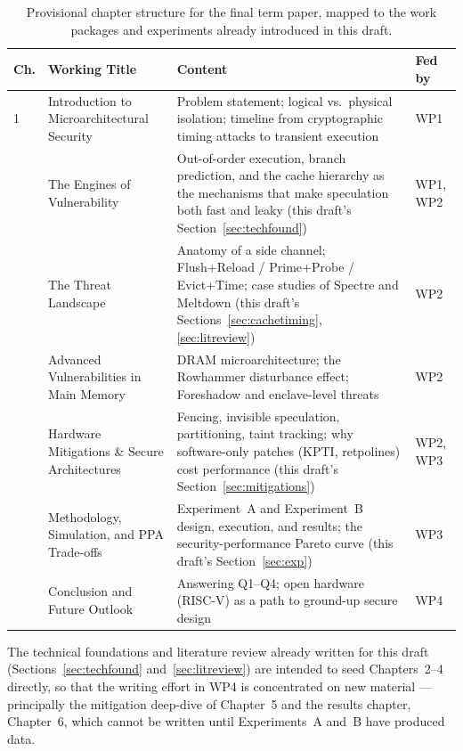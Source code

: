 \documentclass[11pt,a4paper]{article}
\begin{document}
\begin{table}[h]
\centering
\begin{tabular}{@{}p{1.2cm}p{5.4cm}p{5.4cm}p{1.6cm}@{}}
\toprule
\textbf{Ch.} & \textbf{Working Title} & \textbf{Content} & \textbf{Fed by} \\
\midrule
1 & Introduction to Microarchitectural Security & Problem statement; logical vs.\ physical isolation; timeline from cryptographic timing attacks to transient execution & WP1 \\
\addlinespace
2 & The Engines of Vulnerability & Out-of-order execution, branch prediction, and the cache hierarchy as the mechanisms that make speculation both fast and leaky (this draft's Section~\ref{sec:techfound}) & WP1, WP2 \\
\addlinespace
3 & The Threat Landscape & Anatomy of a side channel; Flush+Reload / Prime+Probe / Evict+Time; case studies of Spectre and Meltdown (this draft's Sections~\ref{sec:cachetiming}, \ref{sec:litreview}) & WP2 \\
\addlinespace
4 & Advanced Vulnerabilities in Main Memory & DRAM microarchitecture; the Rowhammer disturbance effect; Foreshadow and enclave-level threats & WP2 \\
\addlinespace
5 & Hardware Mitigations \& Secure Architectures & Fencing, invisible speculation, partitioning, taint tracking; why software-only patches (KPTI, retpolines) cost performance (this draft's Section~\ref{sec:mitigations}) & WP2, WP3 \\
\addlinespace
6 & Methodology, Simulation, and PPA Trade-offs & Experiment~A and Experiment~B design, execution, and results; the security-performance Pareto curve (this draft's Section~\ref{sec:exp}) & WP3 \\
\addlinespace
7 & Conclusion and Future Outlook & Answering Q1--Q4; open hardware (RISC-V) as a path to ground-up secure design & WP4 \\
\bottomrule
\end{tabular}
\caption{Provisional chapter structure for the final term paper, mapped to
the work packages and experiments already introduced in this draft.}
\label{tab:outline}
\end{table}

The technical foundations and literature review already written for this
draft (Sections~\ref{sec:techfound} and~\ref{sec:litreview}) are intended to
seed Chapters~2--4 directly, so that the writing effort in WP4 is
concentrated on new material --- principally the mitigation deep-dive of
Chapter~5 and the results chapter, Chapter~6, which cannot be written until
Experiments~A and~B have produced data.
\end{document}
